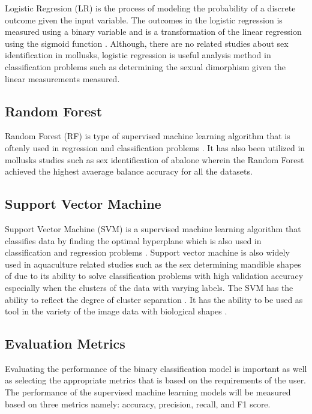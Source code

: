 Logistic Regresion (LR) is the process of modeling the probability of a discrete outcome given the input variable. The outcomes in the logistic regression is measured using a binary variable and is a transformation of the linear regression using the sigmoid function \cite{cui2020}. Although, there are no related studies about sex identification in mollusks, logistic regression is useful analysis method in classification problems such as determining the sexual dimorphism given the linear measurements measured. 

\subsection{Random Forest}

Random Forest (RF) is type of supervised machine learning algorithm that is oftenly used in regression and classification problems \cite{cui2020}. It has also been utilized in mollusks studies such as sex identification of abalone wherein the Random Forest achieved the highest avaerage balance accuracy for all the datasets\cite{arifin2021}.

\subsection{Support Vector Machine}

Support Vector Machine (SVM) is a supervised machine learning algorithm that classifies data by finding the optimal hyperplane which is also used in classification and regression problems \cite{cui2020}. Support vector machine is also widely used in aquaculture related studies such as the sex determining mandible shapes of due to its ability to solve classification problems with high validation accuracy especially when the clusters of the data with varying labels. The SVM has the ability to reflect the degree of cluster separation . It has the ability to be used as tool in the variety of the image data with biological shapes \cite{tsutsumi2023}.

\subsection{Evaluation Metrics}
Evaluating the performance of the binary classification model is important as well as selecting the appropriate metrics that is based on the requirements of the user. The performance of the supervised machine learning models will be measured based on three metrics namely: accuracy, precision, recall, and F1 score. 

